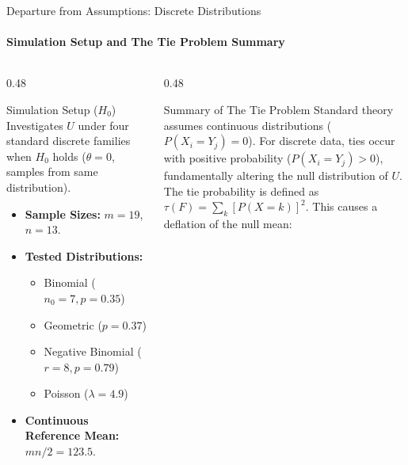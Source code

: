 \documentclass[8pt]{beamer}
\begin{document}
\begin{frame}{Departure from Assumptions: Discrete Distributions}
    \framesubtitle{Simulation Setup and The Tie Problem Summary}

    \begin{columns}[T]
        \begin{column}{0.48\textwidth}
            \begin{block}{Simulation Setup ($H_0$)}
                \small
                Investigates $U$ under four standard discrete families when $H_0$ holds ($\theta=0$, samples from same distribution).
                \vspace{0.2cm}
                \begin{itemize}
                    \item \textbf{Sample Sizes:} $m=19$, $n=13$.
                    \item \textbf{Tested Distributions:}
                    \begin{itemize}
                        \scriptsize
                        \item Binomial ($n_0=7, p=0.35$)
                        \item Geometric ($p=0.37$)
                        \item Negative Binomial ($r=8, p=0.79$)
                        \item Poisson ($\lambda=4.9$)
                    \end{itemize}
                    \item \textbf{Continuous Reference Mean:} $mn/2 = 123.5$.
                \end{itemize}
            \end{block}
        \end{column}

        \begin{column}{0.48\textwidth}
            \begin{block}{Summary of The Tie Problem}
                \small
                Standard theory assumes continuous distributions ($P(X_i=Y_j)=0$). For discrete data, ties occur with positive probability ($P(X_i=Y_j)>0$), fundamentally altering the null distribution of $U$.\\
           
                The tie probability is defined as $\tau(F) = \sum_k [P(X = k)]^2$. This causes a deflation of the null mean:
                

\end{block}
\end{column}
\end{columns}
\end{frame}
\end{document}
